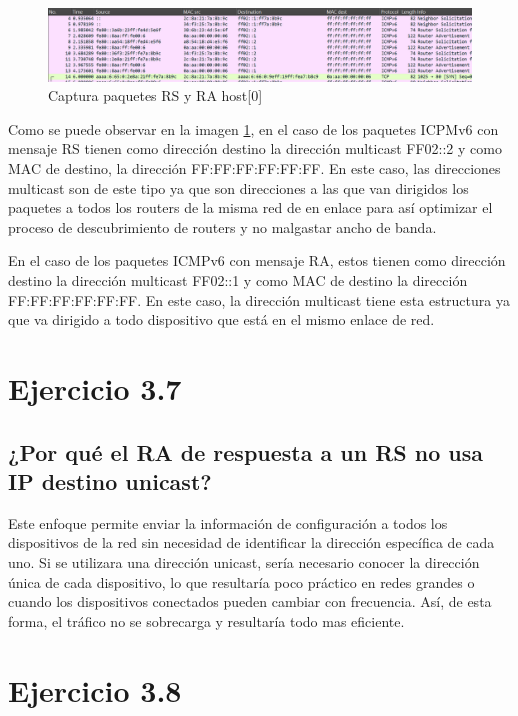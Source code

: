 \begin{figure}[H]
    \centering
    \includegraphics[width=135mm, scale=0.75]{imaxes/captura_ejer3_6.png}
    \caption{Captura paquetes RS y RA host[0]}
    \label{fig:rs_ra_h1}
\end{figure}

Como se puede observar en la imagen \ref{fig:rs_ra_h1}, en el caso de los paquetes ICPMv6 con mensaje RS tienen como dirección destino la dirección multicast FF02::2 y como MAC de destino, la dirección FF:FF:FF:FF:FF:FF. En este caso, las direcciones multicast son de este tipo ya que son direcciones a las que van dirigidos los paquetes a todos los routers de la misma red de en enlace para así optimizar el proceso de descubrimiento de routers y no malgastar ancho de banda.

En el caso de los paquetes ICMPv6 con mensaje RA, estos tienen como dirección destino la dirección multicast FF02::1 y como MAC de destino la dirección FF:FF:FF:FF:FF:FF. En este caso, la dirección multicast tiene esta estructura ya que va dirigido a todo dispositivo que está en el mismo enlace de red. 

\section{Ejercicio 3.7}
\subsection{¿Por qué el RA de respuesta a un RS no usa IP destino unicast?}

Este enfoque permite enviar la información de configuración a todos los dispositivos de la red sin necesidad de identificar la dirección específica de cada uno. Si se utilizara una dirección unicast, sería necesario conocer la dirección única de cada dispositivo, lo que resultaría poco práctico en redes grandes o cuando los dispositivos conectados pueden cambiar con frecuencia. Así, de esta forma, el tráfico no se sobrecarga y resultaría todo mas eficiente.

\section{Ejercicio 3.8}
